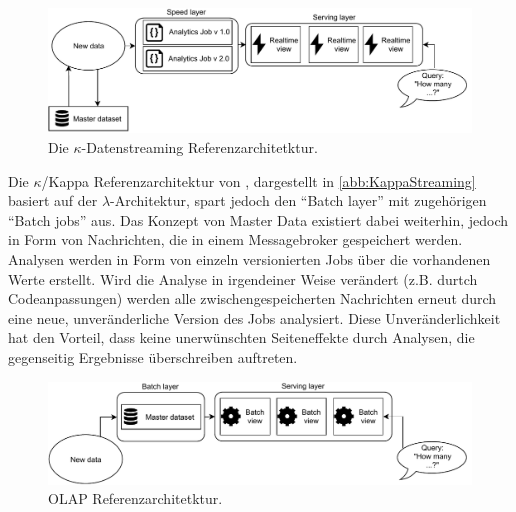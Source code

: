 \begin{figure}[H]
\centering
\includegraphics[width=\textwidth]{graphics/Kappa-Reference-Architecture.pdf}
\caption[Die $\kappa$-Datenstreaming Referenzarchitetktur]{Die $\kappa$-Datenstreaming Referenzarchitetktur.\footnotemark}
\label{abb:KappaStreaming}
\end{figure}

Die $\kappa$/Kappa Referenzarchitektur von \citeauthor{Kreps.2014}, dargestellt in \autoref{abb:KappaStreaming} basiert auf der $\lambda$-Architektur, spart jedoch den \enquote{Batch layer} mit zugehörigen \enquote{Batch jobs} aus. 
Das Konzept von Master Data existiert dabei weiterhin, jedoch in Form von Nachrichten, die in einem Messagebroker gespeichert werden. Analysen werden in Form von einzeln versionierten Jobs über die vorhandenen Werte erstellt. 
Wird die Analyse in irgendeiner Weise verändert (z.B. durtch Codeanpassungen) werden alle zwischengespeicherten Nachrichten erneut durch eine neue, unveränderliche Version des Jobs analysiert. Diese Unveränderlichkeit hat den Vorteil, dass keine unerwünschten Seiteneffekte durch Analysen, die gegenseitig Ergebnisse überschreiben auftreten. 




\begin{figure}[H]
\centering
\includegraphics[width=\textwidth]{graphics/OLAP-Reference-Architecture.pdf}
\caption[OLAP Referenzarchitetktur]{OLAP Referenzarchitetktur.\footnotemark}
\label{abb:OLAPStreaming}
\end{figure}

